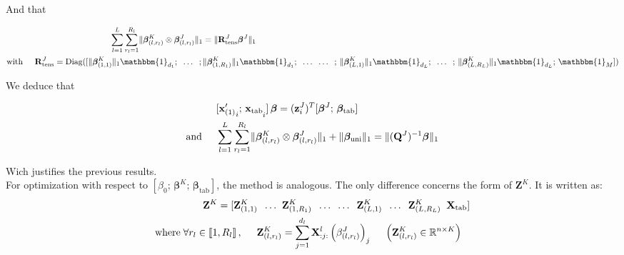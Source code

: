 \documentclass[preprint,12pt]{elsarticle}
\begin{document}
And that

\begin{align}
    \sum\limits_{l = 1}^L \sum\limits_{r_l = 1}^{R_l} \lVert \bm{\beta}_{(l,r_l)}^K \otimes \bm{\beta}_{(l,r_l)}^J \rVert_1                                            & = \lVert \mathbf{R}_{\text{tens}}^J \bm{\beta}^J\rVert_1                                                                                                                                                                                                  \\
    \text{with} \hspace{0.5 cm} \mathbf{R}_{\text{tens}}^J = \text{Diag}    ([\lVert \bm{\beta}_{(1,1)}^K \rVert_1 \mathbbm{1}_{d_1}; \; \; \hdots \; \;; \, & \lVert \bm{\beta}_{(1,R_1)}^K \rVert_1 \mathbbm{1}_{d_1};  \; \; \hdots \; \;  \hdots \; \; ;\, \lVert \bm{\beta}_{(L,1)}^K \rVert_1 \mathbbm{1}_{d_L};  \; \;  \hdots \; \; ;\, \lVert \bm{\beta}_{(L,R_L)}^K \rVert_1 \mathbbm{1}_{d_L}; \, \mathbbm{1}_M])
\end{align}

\noindent We deduce that

\begin{align}
                               & [{\mathbf{x}_{\text{(1)}}'}_i; \, \mathbf{x}_{\text{tab}\raisebox{-4pt}{$\scriptstyle i$}}]\, \bm{\beta}= (\mathbf{z}_i^J)^T [\bm{\beta}^J; \, \bm{\beta}_{\text{tab}}]                                 \\
    \text{and} \hspace{0.5 cm} & \sum\limits_{l = 1}^L \sum\limits_{r_l = 1}^{R_l} \lVert \bm{\beta}_{(l,r_l)}^K \otimes \bm{\beta}_{(l,r_l)}^J \rVert_1 + \lVert \bm{\beta}_{\text{uni}} \rVert_1= \lVert (\mathbf{Q}^J)^{-1} \bm{\beta} \rVert_1
\end{align}

\noindent Wich justifies the previous results.\\[5 pt]
\noindent For optimization with respect to $\left[ \beta_0 ;\, \bm{\beta}^K ;\,  \bm{\beta}_{\text{tab}} \right]$, the method is analogous. The only difference concerns the form of $\mathbf{Z}^K$. It is written as:
\begin{align}
    \mathbf{Z}^K	=[ \mathbf{Z}_{(1,1)}^K \; \; \hdots \; \;                                          & \mathbf{Z}_{(1,R_1)}^K  \; \; \hdots  \; \; \hdots \; \; \mathbf{Z}_{(L,1)}^K \; \; \hdots \; \; \mathbf{Z}_{(L,R_L)}^K \; \; \mathbf{X}_{\text{tab}}] \label{eqref: Z^K}               \\
    \text{where} \; \forall r_l \in \llbracket 1, R_l\rrbracket\, , \hspace{0.5 cm} \mathbf{Z}_{(l,r_l)}^K & = \sum\limits_{j = 1}^{d_l} \mathbf{X}_{:j:}^l \left(\beta_{(l,r_l)}^J\right)_j \hspace{0.5 cm} \left(\mathbf{Z}_{(l,r_l)}^K \in \mathbb{R}^{n \times K}\right) \label{eqref: Z_tens^K}
\end{align}
\end{document}
